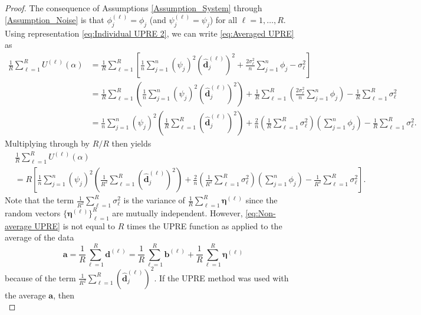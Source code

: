 \documentclass[12pt]{article}
\newcommand{\aVec}{\mathbf{a}}	%
\newcommand{\bVec}{\mathbf{b}}	%
\newcommand{\dVec}{\mathbf{d}}	%
\newcommand{\dft}[1]{\widehat{#1}}	%
\newcommand{\regparam}{\alpha}
\newcommand{\filt}{\phi}
\newcommand{\mfilt}{\psi}
\newcommand{\noise}{\eta}	%
\newcommand{\noiseSD}{\sigma}	%
\newcommand{\noiseVec}{\bm{\noise}}	%
\newcommand{\U}{U}	%
\begin{document}
\begin{proof}
The consequence of Assumptions \ref{Assumption_System} through \ref{Assumption_Noise} is that $\filt_j^{(\ell)} = \filt_j$ (and $\mfilt_j^{(\ell)} = \mfilt_j$) for all $\ell = 1,\ldots,R$. Using representation \eqref{eq:Individual UPRE 2}, we can write \eqref{eq:Averaged UPRE} as
\begin{align*}
\frac{1}{R} \sum_{\ell=1}^R \U^{(\ell)}(\regparam) &= \frac{1}{R} \sum_{\ell=1}^R \left[\frac{1}{n}\sum_{j=1}^{n} \left(\mfilt_j\right)^2\left(\dft{\dVec}_j^{(\ell)}\right)^2 + \frac{2\noiseSD_\ell^2}{n} \sum_{j=1}^{n} \filt_j - \noiseSD_\ell^2\right] \\
&= \frac{1}{R} \sum_{\ell=1}^R \left(\frac{1}{n}\sum_{j=1}^{n} \left(\mfilt_j\right)^2\left(\dft{\dVec}_j^{(\ell)}\right)^2\right) + \frac{1}{R} \sum_{\ell=1}^R \left(\frac{2\noiseSD_\ell^2}{n} \sum_{j=1}^{n} \filt_j\right) - \frac{1}{R} \sum_{\ell=1}^R\noiseSD_\ell^2 \\
&= \frac{1}{n}\sum_{j=1}^{n} \left(\mfilt_j\right)^2\left(\frac{1}{R} \sum_{\ell=1}^R \left(\dft{\dVec}_j^{(\ell)}\right)^2\right) + \frac{2}{n} \left(\frac{1}{R} \sum_{\ell=1}^R \noiseSD_\ell^2\right) \left(\sum_{j=1}^{n} \filt_j\right) - \frac{1}{R} \sum_{\ell=1}^R\noiseSD_\ell^2.
\end{align*}
Multiplying through by $R/R$ then yields
\begin{align}
\label{eq:Non-average UPRE}
&\frac{1}{R} \sum_{\ell=1}^R \U^{(\ell)}(\regparam) \nonumber \\
&= R\left[\frac{1}{n}\sum_{j=1}^{n} \left(\mfilt_j\right)^2\left(\frac{1}{R^2} \sum_{\ell=1}^R \left(\dft{\dVec}_j^{(\ell)}\right)^2\right) + \frac{2}{n} \left(\frac{1}{R^2} \sum_{\ell=1}^R \noiseSD_\ell^2\right) \left(\sum_{j=1}^{n} \filt_j\right) - \frac{1}{R^2} \sum_{\ell=1}^R\noiseSD_\ell^2\right].
\end{align}
Note that the term $\frac{1}{R^2} \sum_{\ell=1}^R\noiseSD_\ell^2$ is the variance of $\frac{1}{R} \sum_{\ell=1}^R \noiseVec^{(\ell)}$ since the random vectors $\{\noiseVec^{(\ell)}\}_{\ell=1}^R$ are mutually independent. However, \eqref{eq:Non-average UPRE} is not equal to $R$ times the UPRE function as applied to the average of the data
\[\aVec = \frac{1}{R}\sum_{\ell=1}^R \dVec^{(\ell)} = \frac{1}{R} \sum_{\ell=1}^R \bVec^{(\ell)} + \frac{1}{R} \sum_{\ell=1}^R \noiseVec^{(\ell)}\]
because of the term $\frac{1}{R^2} \sum_{\ell=1}^R \left(\dft{\dVec}_j^{(\ell)}\right)^2$. If the UPRE method was used with the average $\aVec$, then
\begin{equation}

\end{equation}
\end{proof}
\end{document}
